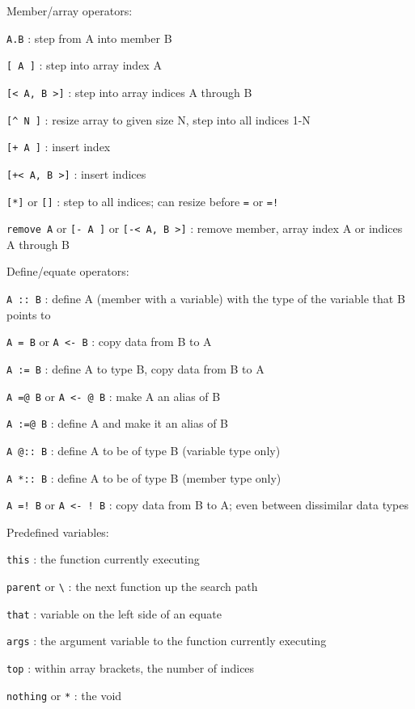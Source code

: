 \documentclass{article}
\begin{document}
\noindent
Member/array operators:
\begin{description}
\item{\verb#A.B#} :  step from A into member B
\item{\verb#[ A ]#} :  step into array index A
\item{\verb#[< A, B >]#} :  step into array indices A through B
\item{\verb#[^ N ]#} :  resize array to given size N, step into all indices 1-N
\item{\verb#[+ A ]#} :  insert index
\item{\verb#[+< A, B >]#} :  insert indices
\item{\verb#[*]#  or  \verb#[]#} :  step to all indices; can resize before \verb#=# or \verb#=!#
\item{\verb#remove A#  or  \verb#[- A ]#  or  \verb#[-< A, B >]#} :  remove member, array index A or indices A through B\\
\end{description}

\noindent
Define/equate operators:
\begin{description}
\item{\verb#A :: B#} :  define A (member with a variable) with the type of the variable that B points to
\item{\verb#A = B#  or  \verb#A <- B#} :  copy data from B to A
\item{\verb#A := B#} :  define A to type B, copy data from B to A
\item{\verb#A =@ B#  or  \verb#A <- @ B#} :  make A an alias of B
\item{\verb#A :=@ B#} :  define A and make it an alias of B
\item{\verb#A @:: B#} :  define A to be of type B (variable type only)
\item{\verb#A *:: B#} :  define A to be of type B (member type only)
\item{\verb#A =! B#  or  \verb#A <- ! B#} :  copy data from B to A; even between dissimilar data types\\
\end{description}

\noindent
Predefined variables:
\begin{description}
\item{\verb#this#} :  the function currently executing
\item{\verb#parent#  or  \verb#\#} :  the next function up the search path
\item{\verb#that#} :  variable on the left side of an equate
\item{\verb#args#} :  the argument variable to the function currently executing
\item{\verb#top#} :  within array brackets, the number of indices
\item{\verb#nothing#  or  \verb#*#} :  the void\\
\end{description}
\end{document}
